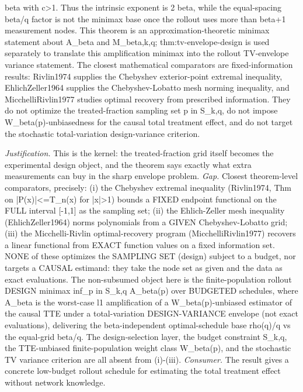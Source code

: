 \documentclass{article}
\begin{document}
beta with c>1. Thus the intrinsic exponent is 2 beta, while the equal-spacing beta/q factor is not the minimax base once the rollout uses more than beta+1 measurement nodes. This theorem is an approximation-theoretic minimax statement about A_beta and M_{beta,k,q}; thm:tv-envelope-design is used separately to translate this amplification minimax into the rollout TV-envelope variance statement. The closest mathematical comparators are fixed-information results: Rivlin1974 supplies the Chebyshev exterior-point extremal inequality, EhlichZeller1964 supplies the Chebyshev-Lobatto mesh norming inequality, and MicchelliRivlin1977 studies optimal recovery from prescribed information. They do not optimize the treated-fraction sampling set p in S_{k,q}, do not impose W_beta(p)-unbiasedness for the causal total treatment effect, and do not target the stochastic total-variation design-variance criterion.
\par\smallskip\noindent \textit{Justification.} This is the kernel: the treated-fraction grid itself becomes the experimental design object, and the theorem says exactly what extra measurements can buy in the sharp envelope problem. \textit{Gap.} Closest theorem-level comparators, precisely: (i) the Chebyshev extremal inequality (Rivlin1974, Thm on |P(x)|<=T_n(x) for |x|>1) bounds a FIXED endpoint functional on the FULL interval [-1,1] as the sampling set; (ii) the Ehlich-Zeller mesh inequality (EhlichZeller1964) norms polynomials from a GIVEN Chebyshev-Lobatto grid; (iii) the Micchelli-Rivlin optimal-recovery program (MicchelliRivlin1977) recovers a linear functional from EXACT function values on a fixed information set. NONE of these optimizes the SAMPLING SET (design) subject to a budget, nor targets a CAUSAL estimand: they take the node set as given and the data as exact evaluations. The non-subsumed object here is the finite-population rollout DESIGN minimax inf_{p in S_{k,q}} A_beta(p) over BUDGETED schedules, where A_beta is the worst-case l1 amplification of a W_beta(p)-unbiased estimator of the causal TTE under a total-variation DESIGN-VARIANCE envelope (not exact evaluations), delivering the beta-independent optimal-schedule base rho(q)/q vs the equal-grid beta/q. The design-selection layer, the budget constraint S_{k,q}, the TTE-unbiased finite-population weight class W_beta(p), and the stochastic TV variance criterion are all absent from (i)-(iii). \textit{Consumer.} The result gives a concrete low-budget rollout schedule for estimating the total treatment effect without network knowledge.
\end{document}
